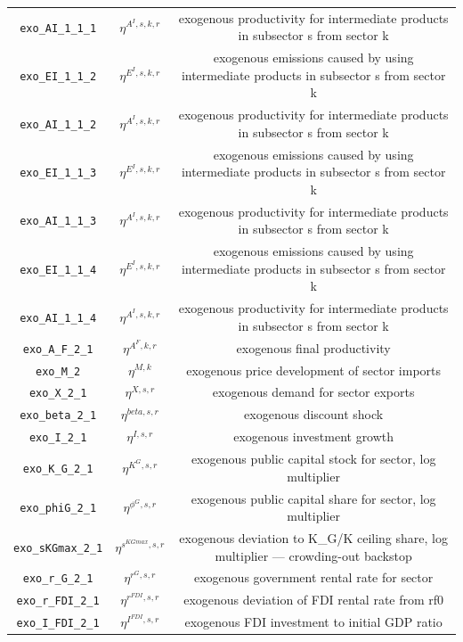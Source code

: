 \begin{center}
\begin{longtable}{ccc}
\texttt{exo\_AI\_1\_1\_1} & ${\eta^{A^{I},s,k,r}}$ & exogenous productivity for intermediate products in subsector s from sector k\\
\texttt{exo\_EI\_1\_1\_2} & ${\eta^{E^{I},s,k,r}}$ & exogenous emissions caused by using intermediate products in subsector s from sector k\\
\texttt{exo\_AI\_1\_1\_2} & ${\eta^{A^{I},s,k,r}}$ & exogenous productivity for intermediate products in subsector s from sector k\\
\texttt{exo\_EI\_1\_1\_3} & ${\eta^{E^{I},s,k,r}}$ & exogenous emissions caused by using intermediate products in subsector s from sector k\\
\texttt{exo\_AI\_1\_1\_3} & ${\eta^{A^{I},s,k,r}}$ & exogenous productivity for intermediate products in subsector s from sector k\\
\texttt{exo\_EI\_1\_1\_4} & ${\eta^{E^{I},s,k,r}}$ & exogenous emissions caused by using intermediate products in subsector s from sector k\\
\texttt{exo\_AI\_1\_1\_4} & ${\eta^{A^{I},s,k,r}}$ & exogenous productivity for intermediate products in subsector s from sector k\\
\texttt{exo\_A\_F\_2\_1} & ${\eta^{A^F,k,r}}$ & exogenous final productivity\\
\texttt{exo\_M\_2} & ${\eta^{M,k}}$ & exogenous price development of sector imports\\
\texttt{exo\_X\_2\_1} & ${\eta^{X,s,r}}$ & exogenous demand for sector exports\\
\texttt{exo\_beta\_2\_1} & ${\eta^{beta,s,r}}$ & exogenous discount shock\\
\texttt{exo\_I\_2\_1} & ${\eta^{I,s,r}}$ & exogenous investment growth\\
\texttt{exo\_K\_G\_2\_1} & ${\eta^{K^G,s,r}}$ & exogenous public capital stock for sector, log multiplier\\
\texttt{exo\_phiG\_2\_1} & ${\eta^{\phi^{G},s,r}}$ & exogenous public capital share for sector, log multiplier\\
\texttt{exo\_sKGmax\_2\_1} & ${\eta^{s^{KGmax},s,r}}$ & exogenous deviation to K\_G/K ceiling share, log multiplier — crowding-out backstop\\
\texttt{exo\_r\_G\_2\_1} & ${\eta^{r^G,s,r}}$ & exogenous government rental rate for sector\\
\texttt{exo\_r\_FDI\_2\_1} & ${\eta^{r^{FDI},s,r}}$ & exogenous deviation of FDI rental rate from rf0\\
\texttt{exo\_I\_FDI\_2\_1} & ${\eta^{I^{FDI},s,r}}$ & exogenous FDI investment to initial GDP ratio\\

\end{longtable}
\end{center}
